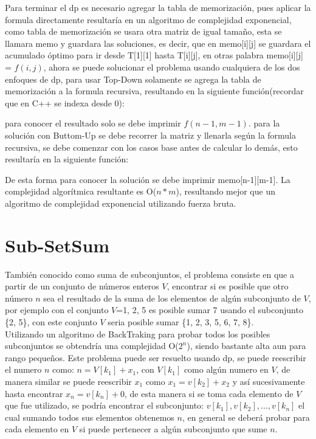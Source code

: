 \documentclass[12pt, a4paper]{article}
\newcommand\cppfile[2][]{

}
\begin{document}
\begin{figure}[!htb]
			\caption{}%
		\endminipage
	\end{figure}
	
	Para terminar el dp es necesario agregar la tabla de memorización, pues aplicar la formula directamente resultaría
	en un algoritmo de complejidad exponencial, como tabla de memorización se usara otra matriz de igual tamaño,
	esta se llamara memo y guardara las soluciones, es decir, que en memo[i][j] se guardara el acumulado óptimo para 
	ir desde T[1][1] hasta T[i][j], en otras palabra memo[i][j] = $f(i,j)$, ahora se puede solucionar el problema 
	usando cualquiera de los dos enfoques de dp, para usar Top-Down solamente se agrega la tabla de memorización 
	a la formula recursiva, resultando en la siguiente función(recordar que en C++ se indexa desde 0):
	\cppfile[9-17]{Programacion_dinamica/codigos/matriz.cpp}
	
	para conocer el resultado solo se debe imprimir $f(n-1, m-1)$. para la solución con Buttom-Up se debe recorrer 
	la matriz y llenarla según la formula recursiva, se debe comenzar con los casos base antes de calcular lo demás, 
	esto resultaría en la siguiente función:
	\cppfile[19-31]{Programacion_dinamica/codigos/matriz.cpp}
	De esta forma para conocer la solución se debe imprimir memo[n-1][m-1]. La complejidad algorítmica resultante
	es O($n*m$), resultando mejor que un algoritmo de complejidad exponencial utilizando fuerza bruta.\\
	
	\section{Sub-SetSum}
	
	También conocido como suma de subconjuntos, el problema consiste en que a partir de un conjunto de números enteros
	$V$, encontrar si es posible que otro número $n$ sea el resultado de la suma de los elementos de algún
	subconjunto de $V$, por ejemplo con el conjunto $V$={1, 2, 5} es posible sumar 7 usando el subconjunto \{2, 5\},
	con este conjunto $V$ seria posible sumar \{1, 2, 3, 5, 6, 7, 8\}.\\
	
	Utilizando un algoritmo de BackTraking para probar todos los posibles subconjuntos se obtendría una complejidad
	O($2^{n}$), siendo bastante alta aun para rango pequeños. Este problema puede ser resuelto usando dp, se puede
	reescribir el numero $n$ como: $n=V[k_{1}]+x_{1}$, con $V[k_{1}]$ como algún numero en $V$, de manera similar se
	puede reescribir $x_{1}$ como $x_{1}=v[k_{2}]+x_{2}$ y así sucesivamente hasta encontrar $x_{n}=v[k_{n}]+0$, de 
	esta manera si se toma cada elemento de $V$ que fue utilizado, se podría encontrar el subconjunto:
	${v[k_{1}],v[k_{2}],...,v[k_{n}]}$ el cual sumando todos sus elementos obtenemos $n$, en general se deberá probar
	para cada elemento en $V$ si puede pertenecer a algún subconjunto que sume $n$.\\
	
\end{document}
